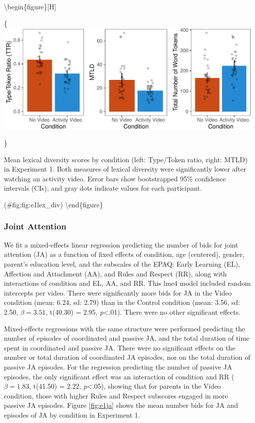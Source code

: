\documentclass[man,floatsintext]{apa6}
\begin{document}
\textbackslash{}begin\{figure\}{[}H{]}

\{\centering \includegraphics{figs/fig:e1lex_div-1}

\}

\caption{Mean lexical diversity scores by condition (left: Type/Token ratio, right: MTLD) in Experiment 1. Both measures of lexical diversity were significantly lower after watching an activity video. Error bars show bootstrapped 95\% confidence intervals (CIs), and gray dots indicate values for each participant.}

(\#fig:fig:e1lex\_div)
\textbackslash{}end\{figure\}

\hypertarget{joint-attention}{%
\subsubsection{Joint Attention}\label{joint-attention}}

We fit a mixed-effects linear regression predicting the number of bids for joint attention (JA) as a function of fixed effects of condition, age (centered), gender, parent's education level, and the subscales of the EPAQ: Early Learning (EL), Affection and Attachment (AA), and Rules and Respect (RR), along with interactions of condition and EL, AA, and RR.
This lme4 model included random intercepts per video.
There were significantly more bids for JA in the Video condition (mean: 6.24, sd: 2.79) than in the Control condition (mean: 3.56, sd: 2.50, \(\beta=3.51\), t(40.30) = 2.95, \emph{p}\textless{}.01).
There were no other significant effects.

Mixed-effects regressions with the same structure were performed predicting the number of episodes of coordinated and passive JA, and the total duration of time spent in coordinated and passive JA.
There were no significant effects on the number or total duration of coordinated JA episodes, nor on the total duration of passive JA episodes.
For the regression predicting the number of passive JA episodes, the only significant effect was an interaction of condition and RR (\(\beta=1.83\), t(41.50) = 2.22, \emph{p}\textless{}.05), showing that for parents in the Video condition, those with higher Rules and Respect subscores engaged in more passive JA episodes.
Figure \ref{fig:e1ja} shows the mean number bids for JA and episodes of JA by condition in Experiment 1.
\end{document}
